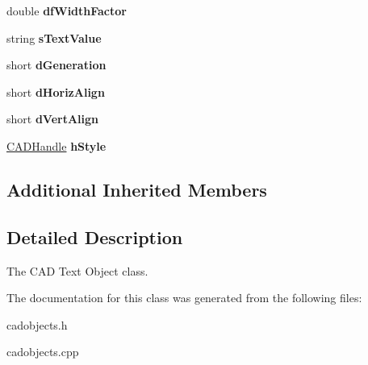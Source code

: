 \begin{DoxyCompactItemize}
\item 
double {\bfseries df\+Width\+Factor}\hypertarget{class_c_a_d_text_object_a0a084773f9ae039e4ef433804b88f495}{}\label{class_c_a_d_text_object_a0a084773f9ae039e4ef433804b88f495}

\item 
string {\bfseries s\+Text\+Value}\hypertarget{class_c_a_d_text_object_a4088f12c0bd594572fb590c9bc42bade}{}\label{class_c_a_d_text_object_a4088f12c0bd594572fb590c9bc42bade}

\item 
short {\bfseries d\+Generation}\hypertarget{class_c_a_d_text_object_a909002f2921a4cb8ef9969ca7a5845f6}{}\label{class_c_a_d_text_object_a909002f2921a4cb8ef9969ca7a5845f6}

\item 
short {\bfseries d\+Horiz\+Align}\hypertarget{class_c_a_d_text_object_a0ea3e5507310ecb4625dfdcd79cf2af5}{}\label{class_c_a_d_text_object_a0ea3e5507310ecb4625dfdcd79cf2af5}

\item 
short {\bfseries d\+Vert\+Align}\hypertarget{class_c_a_d_text_object_ab17c7fa8002e8357b1e74982ee932781}{}\label{class_c_a_d_text_object_ab17c7fa8002e8357b1e74982ee932781}

\item 
\hyperlink{class_c_a_d_handle}{C\+A\+D\+Handle} {\bfseries h\+Style}\hypertarget{class_c_a_d_text_object_a8e317507716cdeb550387cd745a75ca3}{}\label{class_c_a_d_text_object_a8e317507716cdeb550387cd745a75ca3}

\end{DoxyCompactItemize}
\subsection*{Additional Inherited Members}


\subsection{Detailed Description}
The C\+AD Text Object class. 

The documentation for this class was generated from the following files\+:\begin{DoxyCompactItemize}
\item 
cadobjects.\+h\item 
cadobjects.\+cpp\end{DoxyCompactItemize}
